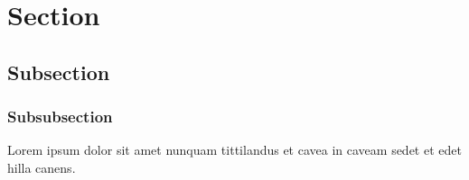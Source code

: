 \documentclass[a4paper,10pt]{article}
\date{\today}
\begin{document}
	\maketitle
	\tableofcontents
	\newpage
	
	
	\section{Section}
	\subsection{Subsection}
	\subsubsection{Subsubsection}
	
	Lorem ipsum dolor sit amet nunquam tittilandus et cavea in caveam sedet et edet hilla canens.
\end{document}
